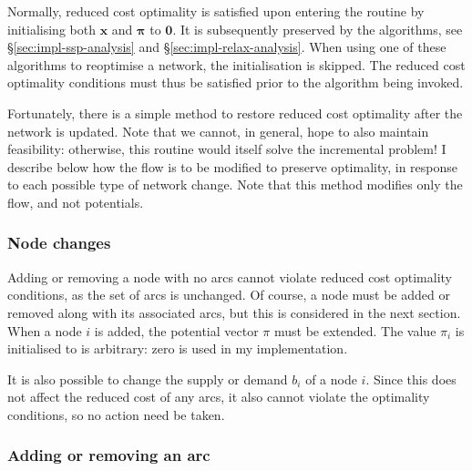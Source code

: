 Normally, reduced cost optimality is satisfied upon entering the routine by initialising both $\mathbf{x}$ and $\boldsymbol{\pi}$ to $\mathbf{0}$. It is subsequently preserved by the algorithms, see \S\ref{sec:impl-ssp-analysis} and \S\ref{sec:impl-relax-analysis}. When using one of these algorithms to reoptimise a network, the initialisation is skipped\footnotemark. The reduced cost optimality conditions must thus be satisfied prior to the algorithm being invoked.

Fortunately, there is a simple method to restore reduced cost optimality after the network is updated. Note that we cannot, in general, hope to also maintain feasibility\footnotemark: otherwise, this routine would itself solve the incremental problem! I describe below how the flow is to be modified to preserve optimality, in response to each possible type of network change. Note that this method modifies only the flow, and not potentials.

\subsubsection{Node changes}

Adding or removing a node with no arcs cannot violate reduced cost optimality conditions, as the set of arcs is unchanged. Of course, a node must be added or removed along with its associated arcs\footnotemark, but this is considered in the next section. When a node $i$ is added, the potential vector $\pi$ must be extended. The value $\pi_i$ is initialised to is arbitrary: zero is used in my implementation.

It is also possible to change the supply or demand $b_i$ of a node $i$\footnotemark. Since this does not affect the reduced cost of any arcs, it also cannot violate the optimality conditions, so no action need be taken.

\subsubsection{Adding or removing an arc}

